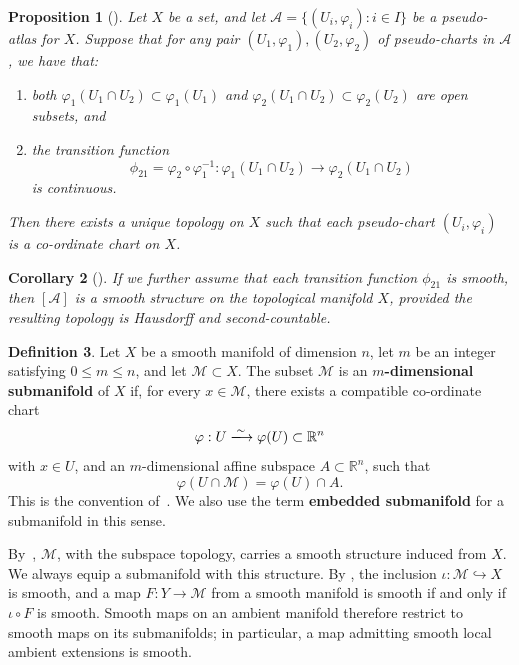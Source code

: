 \documentclass[12pt]{article}
\theoremstyle{definition}
\newtheorem{definition}{Definition}[section]
\theoremstyle{plain}
\newtheorem{proposition}[definition]{Proposition}
\newtheorem{corollary}[definition]{Corollary}
\theoremstyle{remark}
\newcommand{\R}{\mathbb{R}}
\begin{document}
\begin{proposition}[{\cite[Proposition 2.26]{segal}}]\label{prop:pseudo-atlas-topology}
  Let \( X \) be a set, and let \( \mathcal{A} = \{ (U_i,\varphi_i) : i \in I \} \) be a pseudo-atlas for \( X \). Suppose that for any pair \( (U_1, \varphi_1), (U_2, \varphi_2) \) of pseudo-charts in \( \mathcal{A} \), we have that:
  \begin{enumerate}
    \item both \( \varphi_1(U_1 \cap U_2) \subset \varphi_1(U_1) \) and \( \varphi_2(U_1 \cap U_2) \subset \varphi_2(U_2) \) are open subsets, and
    \item the transition function
    \[
      \phi_{21} = \varphi_2 \circ \varphi_1^{-1} : \varphi_1(U_1 \cap U_2) \longrightarrow \varphi_2(U_1 \cap U_2)
    \]
    is continuous.
  \end{enumerate}
  Then there exists a unique topology on \( X \) such that each pseudo-chart \( (U_i, \varphi_i) \) is a co-ordinate chart on \( X \).
\end{proposition}

\begin{corollary}[{\cite[Corollary 2.28]{segal}}]\label{cor:pseudo-atlas-smooth-structure}
  If we further assume that each transition function \( \phi_{21} \) is smooth, then \( [\mathcal{A}] \) is a smooth structure on the topological manifold \( X \), provided the resulting topology is Hausdorff and second-countable.
\end{corollary}

\begin{definition}\label{def:embedded-submanifold}
  Let \( X \) be a smooth manifold of dimension \( n \), let \( m \) be an integer satisfying \( 0 \leq m \leq n \), and let \( \mathcal{M} \subset X \).
  The subset \( \mathcal{M} \) is an \textbf{\( m \)-dimensional submanifold} of \( X \) if, for every \( x \in \mathcal{M} \), there exists a compatible co-ordinate chart
  \[
    \varphi : U \xlongrightarrow{\sim} \varphi(U) \subset \R^n
  \]
  with \( x \in U \), and an \( m \)-dimensional affine subspace \( A \subset \R^n \), such that
  \[
    \varphi(U \cap \mathcal{M}) = \varphi(U) \cap A.
  \]
  This is the convention of~\cite[Definition 3.2]{segal}. We also use the term \textbf{embedded submanifold} for a submanifold in this sense.
\end{definition}

By~\cite[Proposition 3.7]{segal}, \( \mathcal{M} \), with the subspace topology, carries a smooth structure induced from \( X \).
We always equip a submanifold with this structure. By \cite[Lemmas 4.7--4.8]{segal}, the inclusion \( \iota : \mathcal{M} \hookrightarrow X \) is smooth, and a map \( F : Y \longrightarrow \mathcal{M} \) from a smooth manifold is smooth if and only if \( \iota \circ F \) is smooth. Smooth maps on an ambient manifold therefore restrict to smooth maps on its submanifolds; in particular, a map admitting smooth local ambient extensions is smooth.
\end{document}
